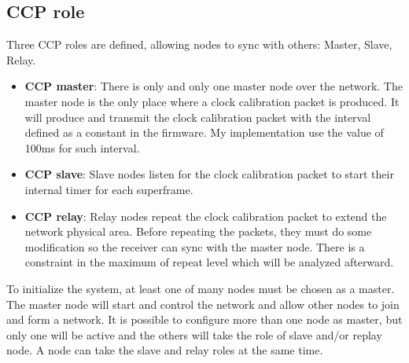 \documentclass[\main/main.tex]{subfiles}
\begin{document}
\subsection{CCP role}
Three CCP roles are defined, allowing nodes to sync with others: Master, Slave, Relay.
\begin{itemize}
    \item \textbf{CCP master}: There is only and only one master node over the network. The master node is the only place where a clock calibration packet is produced. It will produce and transmit the clock calibration packet with the interval defined as a constant in the firmware. My implementation use the value of 100ms for such interval. 
    \item \textbf{CCP slave}: Slave nodes listen for the clock calibration packet to start their internal timer for each superframe.
    \item \textbf{CCP relay}: Relay nodes repeat the clock calibration packet to extend the network physical area. Before repeating the packets, they must do some modification so the receiver can sync with the  master node. There is a constraint in the maximum of repeat level which will be analyzed afterward.
\end{itemize}

To initialize the system, at least one of many nodes must be chosen as a master. The master node will start and control the network and allow other nodes to join and form a network. It is possible to configure more than one node as master, but only one will be active and the others will take the role of slave and/or replay node. A node can take the slave and relay roles at the same time.
\end{document}

